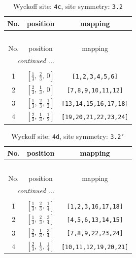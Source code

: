 \documentclass[fleqn,8pt]{jsarticle}
\begin{document}
\renewcommand{\arraystretch}{1.2}
\begin{longtable}{ccc}
\caption{Wyckoff site: {\tt 4c}, site symmetry: {\tt 3.2}}
 \\
 \hline \hline
No. & position & mapping \\ \hline \endfirsthead

\multicolumn{2}{l}{\tablename\ \thetable{}} \\
 \hline \hline
No. & position & mapping \\ \hline \endhead

 \hline \hline
\multicolumn{2}{r}{\footnotesize\it continued ...} \\ \endfoot

 \hline \hline
\multicolumn{2}{r}{} \\ \endlastfoot

1 & $\left[ \frac{1}{3},\, \frac{2}{3},\, 0 \right]$ & {\tt [1,2,3,4,5,6]} \\ \hline
2 & $\left[ \frac{2}{3},\, \frac{1}{3},\, 0 \right]$ & {\tt [7,8,9,10,11,12]} \\ \hline
3 & $\left[ \frac{1}{3},\, \frac{2}{3},\, \frac{1}{2} \right]$ & {\tt [13,14,15,16,17,18]} \\ \hline
4 & $\left[ \frac{2}{3},\, \frac{1}{3},\, \frac{1}{2} \right]$ & {\tt [19,20,21,22,23,24]} \\
\end{longtable}
\renewcommand{\arraystretch}{1.2}
\begin{longtable}{ccc}
\caption{Wyckoff site: {\tt 4d}, site symmetry: {\tt 3.2'}}
 \\
 \hline \hline
No. & position & mapping \\ \hline \endfirsthead

\multicolumn{2}{l}{\tablename\ \thetable{}} \\
 \hline \hline
No. & position & mapping \\ \hline \endhead

 \hline \hline
\multicolumn{2}{r}{\footnotesize\it continued ...} \\ \endfoot

 \hline \hline
\multicolumn{2}{r}{} \\ \endlastfoot

1 & $\left[ \frac{1}{3},\, \frac{2}{3},\, \frac{1}{4} \right]$ & {\tt [1,2,3,16,17,18]} \\ \hline
2 & $\left[ \frac{1}{3},\, \frac{2}{3},\, \frac{3}{4} \right]$ & {\tt [4,5,6,13,14,15]} \\ \hline
3 & $\left[ \frac{2}{3},\, \frac{1}{3},\, \frac{3}{4} \right]$ & {\tt [7,8,9,22,23,24]} \\ \hline
4 & $\left[ \frac{2}{3},\, \frac{1}{3},\, \frac{1}{4} \right]$ & {\tt [10,11,12,19,20,21]} \\
\end{longtable}
\end{document}
